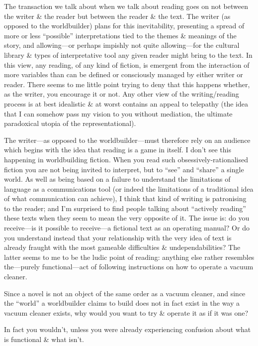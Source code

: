 \documentclass[14pt]{extarticle}
\begin{document}
The transaction we talk about when we talk about reading goes on not between the writer \& the reader but between the reader \& the text. The writer (as opposed to the worldbuilder) plans for this inevitability, presenting a spread of more or less “possible” interpretations tied to the themes \& meanings of the story, and allowing—or perhaps impishly not quite allowing—for the cultural library \& types of interpretative tool any given reader might bring to the text. In this view, any reading, of any kind of fiction, is emergent from the interaction of more variables than can be defined or consciously managed by either writer or reader. There seems to me little point trying to deny that this happens whether, as the writer, you encourage it or not. Any other view of the writing/reading process is at best idealistic \& at worst contains an appeal to telepathy (the idea that I can somehow pass my vision to you without mediation, the ultimate paradoxical utopia of the representational).

The writer—as opposed to the worldbuilder—must therefore rely on an audience which begins with the idea that reading is a game in itself. I don’t see this happening in worldbuilding fiction. When you read such obsessively-rationalised fiction you are not being invited to interpret, but to “see” and “share” a single world. As well as being based on a failure to understand the limitations of language as a communications tool (or indeed the limitations of a traditional idea of what communication can achieve), I think that kind of writing is patronising to the reader; and I’m surprised to find people talking about “actively reading” these texts when they seem to mean the very opposite of it. The issue is: do you receive—is it possible to receive—a fictional text as an operating manual? Or do you understand instead that your relationship with the very idea of text is already fraught with the most gameable difficulties \& undependabilities? The latter seems to me to be the ludic point of reading: anything else rather resembles the—purely functional—act of following instructions on how to operate a vacuum cleaner.

Since a novel is not an object of the same order as a vacuum cleaner, and since the “world” a worldbuilder claims to build does not in fact exist in the way a vacuum cleaner exists, why would you want to try \& operate it as if it was one?

In fact you wouldn’t, unless you were already experiencing confusion about what is functional \& what isn’t.
\end{document}
